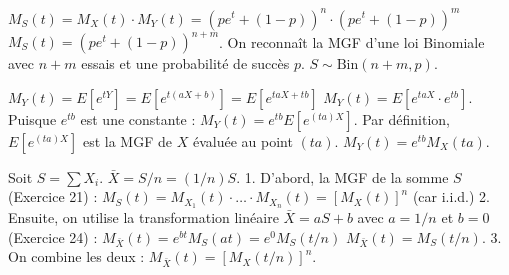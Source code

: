 \begin{correctionbox}
$M_S(t) = M_X(t) \cdot M_Y(t) = (p e^t + (1-p))^n \cdot (p e^t + (1-p))^m$
$M_S(t) = (p e^t + (1-p))^{n+m}$.
On reconnaît la MGF d'une loi Binomiale avec $n+m$ essais et une probabilité de succès $p$.
$S \sim \text{Bin}(n+m, p)$.
\end{correctionbox}

\begin{correctionbox}
$M_Y(t) = E[e^{tY}] = E[e^{t(aX + b)}] = E[e^{taX + tb}]$
$M_Y(t) = E[e^{taX} \cdot e^{tb}]$.
Puisque $e^{tb}$ est une constante :
$M_Y(t) = e^{tb} E[e^{(ta)X}]$.
Par définition, $E[e^{(ta)X}]$ est la MGF de $X$ évaluée au point $(ta)$.
$M_Y(t) = e^{tb} M_X(ta)$.
\end{correctionbox}

\begin{correctionbox}
Soit $S = \sum X_i$. $\bar{X} = S / n = (1/n)S$.
1.  D'abord, la MGF de la somme $S$ (Exercice 21) :
    $M_S(t) = M_{X_1}(t) \cdot \dots \cdot M_{X_n}(t) = [M_X(t)]^n$ (car i.i.d.)
2.  Ensuite, on utilise la transformation linéaire $\bar{X} = aS + b$ avec $a=1/n$ et $b=0$ (Exercice 24) :
    $M_{\bar{X}}(t) = e^{b t} M_S(a t) = e^0 M_S(t/n)$
    $M_{\bar{X}}(t) = M_S(t/n)$.
3.  On combine les deux :
    $M_{\bar{X}}(t) = [M_X(t/n)]^n$.
\end{correctionbox}
